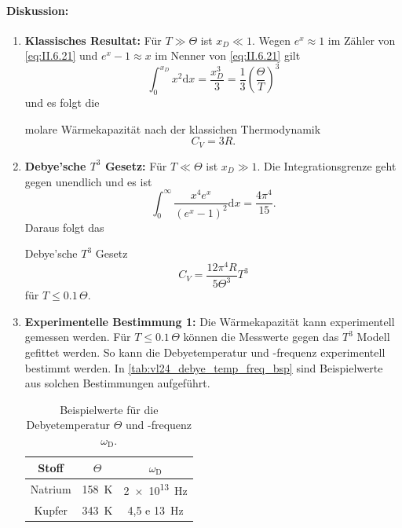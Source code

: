 \paragraph{Diskussion:}
\begin{enumerate}
	\item 
		\textbf{Klassisches Resultat:} Für $T\gg\Theta$ ist $x_{D} \ll 1$. Wegen $e^{x} \approx 1$ im Zähler von \eqref{eq:II.6.21} und $e^{x}-1\approx x$ im Nenner von \eqref{eq:II.6.21} gilt
		$$
		\int_{0}^{x_{D}} x^2 \mathrm{d}x = \frac{x_{D}^3}{3} = \frac{1}{3} \left( \frac{\Theta}{T} \right) ^3
		$$ 
		und es folgt die
		\begin{important}
			molare Wärmekapazität nach der klassichen Thermodynamik
			\begin{equation}
				\label{eq:II.6.22}
				C_{V} = 3R.
			\end{equation}
		\end{important}
	\item 
		\textbf{Debye'sche $T^3$ Gesetz:} Für $T \ll \Theta$ ist $x_{D} \gg 1$. Die Integrationsgrenze geht gegen unendlich und es ist 
		$$
		\int_{0}^{\infty} \frac{x^{4} e^{x}}{\left( e^{x} -1 \right) ^2} \mathrm{d}x = \frac{4\pi^{4}}{15}.
		$$ 
		Daraus folgt das 
		\begin{important}
			Debye'sche $T^3$ Gesetz\\
			\begin{equation}
				\label{eq:II.6.23}
				C_{V}= \frac{12 \pi^{4}R}{5 \Theta^3} T^3 
			\end{equation}
			für $T\le \num{0,1}\,\Theta$.
		\end{important}
	\item 
		\textbf{Experimentelle Bestimmung 1:} Die Wärmekapazität kann experimentell gemessen werden. 
		Für $T\leq0.1\,\Theta$ können die Messwerte gegen das $T^3$ Modell gefittet werden. 
		So kann die Debyetemperatur und -frequenz experimentell bestimmt werden.
		In \autoref{tab:vl24_debye_temp_freq_bsp} sind Beispielwerte aus solchen Bestimmungen aufgeführt.
		\begin{table}[H]
			\centering
			\caption{Beispielwerte für die Debyetemperatur $\Theta$ und -frequenz $\omega_\mathrm D$.}
			\label{tab:vl24_debye_temp_freq_bsp}
			\begin{tabular}{ccc}
				\toprule
				Stoff & $\Theta$ & $\omega_\mathrm{D}$ \\
				\midrule
				Natrium & \SI{158}{\kelvin} & \SI{2 e13}{\hertz} \\
				Kupfer & \SI{343}{\kelvin} & \SI{4,5 e 13}{\hertz}\\

\end{tabular}
\end{table}
\end{enumerate}
